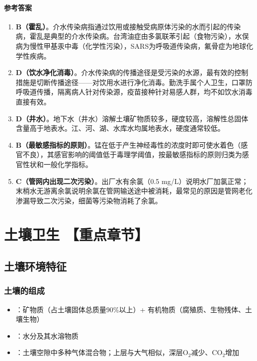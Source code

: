 \documentclass[10pt,a4paper,oneside]{ctexbook}
\begin{document}
\subsubsection*{参考答案}
\begin{enumerate}[leftmargin=*, itemsep=5pt]
    \item \textbf{B（霍乱）}。介水传染病指通过饮用或接触受病原体污染的水而引起的传染病，霍乱是典型的介水传染病。台湾油症由多氯联苯引起（食物污染），水俣病为慢性甲基汞中毒（化学性污染），SARS为呼吸道传染病，氟骨症为地球化学性疾病。
    \item \textbf{D（饮水净化消毒）}。介水传染病的传播途径是受污染的水源，最有效的控制措施是切断传播途径——对饮用水进行净化消毒。勤洗手属个人卫生，口罩防呼吸道传播，隔离病人针对传染源，疫苗接种针对易感人群，均不如饮水消毒直接有效。
    \item \textbf{D（井水）}。地下水（井水）溶解土壤矿物质较多，硬度较高，溶解性总固体含量高于地表水。江、河、湖、水库水均属地表水，硬度通常较低。
    \item \textbf{B（最敏感指标的原则）}。锰在低于产生神经毒性的浓度时即可使水着色（感官不良），其感官影响的阈值低于毒理学阈值，按最敏感指标的原则归类为感官性状和一般化学指标。
    \item \textbf{C（管网内出现二次污染）}。出厂水有余氯（0.5 mg/L）说明水厂加氯正常；末梢水无游离余氯说明余氯在管网输送途中被消耗，最常见的原因是管网老化渗漏导致二次污染，细菌等污染物消耗了余氯。
\end{enumerate}

\newpage

\chapter{土壤卫生  【重点章节】}
\setcounter{chapter}{7}

\section{土壤环境特征}

\subsection{土壤的组成}
\begin{itemize}[leftmargin=*]
    \item {}：矿物质（占土壤固体总质量90\%以上）+ 有机物质（腐殖质、生物残体、土壤生物）
    \item {}：水分及其水溶物质
    \item {}：土壤空隙中多种气体混合物；上层与大气相似，深层O$_2$减少、CO$_2$增加
\end{itemize}
\end{document}
